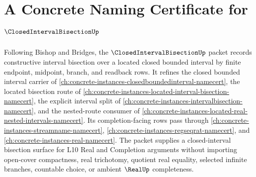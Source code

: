 \chapter{A Concrete Naming Certificate for $\ClosedIntervalBisectionUp$}
\label{ch:concrete-instances-closed-interval-bisection-namecert}

Following Bishop and Bridges, the $\ClosedIntervalBisectionUp$ packet records constructive interval bisection over a located closed bounded interval by finite endpoint, midpoint, branch, and readback rows. It refines the closed bounded interval carrier of \autoref{ch:concrete-instances-closedboundedinterval-namecert}, the located bisection route of \autoref{ch:concrete-instances-located-interval-bisection-namecert}, the explicit interval split of \autoref{ch:concrete-instances-intervalbisection-namecert}, and the nested-route consumer of \autoref{ch:concrete-instances-located-real-nested-intervals-namecert}. Its completion-facing rows pass through \autoref{ch:concrete-instances-streamname-namecert}, \autoref{ch:concrete-instances-regseqrat-namecert}, and \autoref{ch:concrete-instances-real-namecert}. The packet supplies a closed-interval bisection surface for L10 Real and Completion arguments without importing open-cover compactness, real trichotomy, quotient real equality, selected infinite branches, countable choice, or ambient $\RealUp$ completeness.

